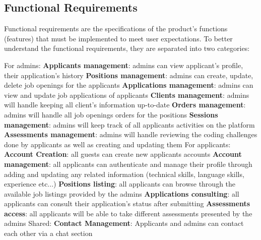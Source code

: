 \documentclass[../main.tex]{subfiles}
\begin{document}
\subsection{Functional Requirements}
Functional requirements are the specifications of the product's functions (features) that must be implemented to meet user expectations.\cite{functional_req}
\newline
To better understand the functional requirements, they are separated into two categories:
\begin{outline}
 \1 For admins:
   \2 \textbf{Applicants management}: admins can view applicant's profile, their application's history
   \2 \textbf{Positions management}: admins can create, update, delete job openings for the applicants
   \2 \textbf{Applications management}: admins can view and update job applications of applicants
   \2 \textbf{Clients management}: admins will handle keeping all client's information up-to-date
   \2 \textbf{Orders management}: admins will handle all job openings orders for the positions
   \2 \textbf{Sessions management}: admins will keep track of all applicants activities on the platform
   \2 \textbf{Assessments management}: admins will handle reviewing the coding challenges done by applicants as well as creating and updating them
 \1 For applicants: 
    \2 \textbf{Account Creation}: all guests can create new applicants accounts
    \2 \textbf{Account management}: all applicants can authenticate and manage their profile through adding and updating any related information (technical skills, language skills, experience etc...)
    \2 \textbf{Positions listing}: all applicants can browse through the available job listings provided by the admins
    \2 \textbf{Applications consulting}: all applicants can consult their application's status after submitting
    \2 \textbf{Assessments access}: all applicants will be able to take different assessments presented by the admins
 \1 Shared: 
    \2 \textbf{Contact Management}: Applicants and admins can contact each other via a chat section
\end{outline}
\end{document}
